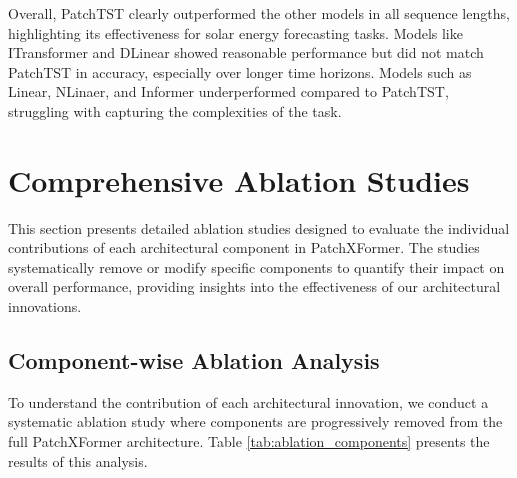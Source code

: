 \documentclass[12pt]{uomthesis}
\begin{document}
Overall, PatchTST clearly outperformed the other models in all sequence lengths, highlighting its effectiveness for solar energy forecasting tasks. Models like ITransformer and DLinear showed reasonable performance but did not match PatchTST in accuracy, especially over longer time horizons. Models such as Linear, NLinaer, and Informer underperformed compared to PatchTST, struggling with capturing the complexities of the task.


\section{Comprehensive Ablation Studies}

This section presents detailed ablation studies designed to evaluate the individual contributions of each architectural component in PatchXFormer. The studies systematically remove or modify specific components to quantify their impact on overall performance, providing insights into the effectiveness of our architectural innovations.

\subsection{Component-wise Ablation Analysis}

To understand the contribution of each architectural innovation, we conduct a systematic ablation study where components are progressively removed from the full PatchXFormer architecture. Table \ref{tab:ablation_components} presents the results of this analysis.
\end{document}
